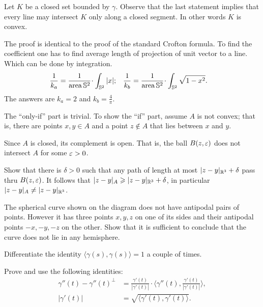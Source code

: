 Let $K$ be a closed set bounded by $\gamma$.
Observe that the last statement implies that every line may intersect $K$ only along a closed segment.
In other words $K$ is convex.

The proof is identical to the proof of the standard Crofton formula.
To find the coefficient one has to find average length of projection of unit vector to a line.
Which can be done by integration.
\begin{align*}
\frac1{k_a}&=\frac{1}{\area \SS^2}\cdot\int_{\SS^2} |x|;
&
\frac1{k_b}&=\frac{1}{\area \SS^2}\cdot\int_{\SS^2} \sqrt{1-x^2}.
\end{align*}
The answers are $k_a=2$ and $k_b=\tfrac4\pi$.


The ``only-if'' part is trivial.
To show the ``if'' part, assume $A$ is not convex;
that is, there are points $x,y\in A$ and a point $z\notin A$ that lies between $x$ and $y$.

Since $A$ is closed, its complement is open.
That is, the ball $B(z,\varepsilon)$ does not intersect $A$ for some $\varepsilon>0$.

Show that there is $\delta>0$ such that any path of length at most $|z-y|_{\mathbb{R}^3}+\delta$ pass thru $B(z,\varepsilon)$.
It follows that $|z-y|_A\geqslant |z-y|_{\mathbb{R}^3}+\delta$, 
in particular$|z-y|_A\ne |z-y|_{\mathbb{R}^3}$.

The spherical curve shown on the diagram does not have antipodal pairs of points.
However it has three points $x,y,z$ on one of its sides and their antipodal points $-x,-y,-z$ on the other.
Show that it is sufficient to conclude that the curve does not lie in any hemisphere.





 Differentiate the identity $\langle\gamma(s),\gamma(s)\rangle=1$ a couple of times.

 Prove and use the following identities: 
\begin{align*}
\gamma''(t)-\gamma''(t)^\perp&=\tfrac{\gamma'(t)}{|\gamma'(t)|}\cdot\langle\gamma''(t),\tfrac{\gamma'(t)}{|\gamma'(t)|}\rangle,
\\
|\gamma'(t)|&=\sqrt{\langle \gamma'(t),\gamma'(t)\rangle}.\
\end{align*}

